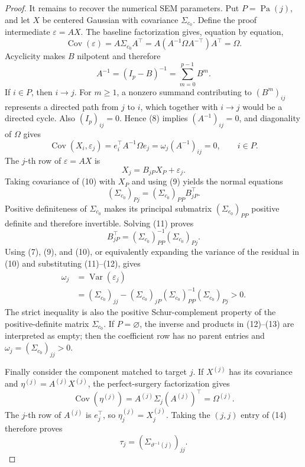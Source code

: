 \documentclass{article}
\begin{document}
\begin{proof}
It remains to recover the numerical SEM parameters.  Put
\(P=\operatorname{Pa}(j)\), and let \(X\) be centered Gaussian with covariance
\(\Sigma_{c_0}\).  Define the proof intermediate \(\varepsilon=AX\).  The
baseline factorization gives, equation by equation,
\[
 \operatorname{Cov}(\varepsilon)
 =A\Sigma_{c_0}A^{\top}
 =A(A^{-1}\Omega A^{-\top})A^{\top}
 =\Omega.                                               \tag{7}
\]
Acyclicity makes \(B\) nilpotent and therefore
\[
 A^{-1}=(I_p-B)^{-1}=\sum_{m=0}^{p-1}B^m.               \tag{8}
\]
If \(i\in P\), then \(i\to j\).  For \(m\geq1\), a nonzero summand
contributing to \((B^m)_{ij}\) represents a directed path from \(j\) to
\(i\), which together with \(i\to j\) would be a directed cycle.  Also
\((I_p)_{ij}=0\).  Hence (8) implies
\((A^{-1})_{ij}=0\), and diagonality of \(\Omega\) gives
\[
 \operatorname{Cov}(X_i,\varepsilon_j)
 =e_i^{\top}A^{-1}\Omega e_j
 =\omega_j(A^{-1})_{ij}=0,
 \qquad i\in P.                                        \tag{9}
\]
The \(j\)-th row of \(\varepsilon=AX\) is
\[
 X_j=B_{jP}X_P+\varepsilon_j.                           \tag{10}
\]
Taking covariance of (10) with \(X_P\) and using (9) yields the normal
equations
\[
 (\Sigma_{c_0})_{Pj}
 =(\Sigma_{c_0})_{PP}B_{jP}^{\top}.                     \tag{11}
\]
Positive definiteness of \(\Sigma_{c_0}\) makes its principal submatrix
\((\Sigma_{c_0})_{PP}\) positive definite and therefore invertible.  Solving
(11) proves
\[
 B_{jP}^{\top}
 =(\Sigma_{c_0})_{PP}^{-1}(\Sigma_{c_0})_{Pj}.           \tag{12}
\]
Using (7), (9), and (10), or equivalently expanding the variance of the
residual in (10) and substituting (11)--(12), gives
\[
 \begin{aligned}
 \omega_j
 &=\operatorname{Var}(\varepsilon_j)\\
 &=(\Sigma_{c_0})_{jj}
   -(\Sigma_{c_0})_{jP}
    (\Sigma_{c_0})_{PP}^{-1}
    (\Sigma_{c_0})_{Pj}>0.                              \tag{13}
 \end{aligned}
\]
The strict inequality is also the positive Schur-complement property of the
positive-definite matrix \(\Sigma_{c_0}\).  If \(P=\varnothing\), the inverse
and products in (12)--(13) are interpreted as empty; then the coefficient row
has no parent entries and \(\omega_j=(\Sigma_{c_0})_{jj}>0\).

Finally consider the component matched to target \(j\).  If \(X^{(j)}\) has
its covariance and \(\eta^{(j)}=A^{(j)}X^{(j)}\), the perfect-surgery
factorization gives
\[
 \operatorname{Cov}(\eta^{(j)})
 =A^{(j)}\Sigma_j(A^{(j)})^{\top}
 =\Omega^{(j)}.                                         \tag{14}
\]
The \(j\)-th row of \(A^{(j)}\) is \(e_j^{\top}\), so
\(\eta_j^{(j)}=X_j^{(j)}\).  Taking the \((j,j)\) entry of (14) therefore
proves
\[
 \tau_j=(\Sigma_{\vartheta^{-1}(j)})_{jj}.              \tag{15}
\]


\end{proof}
\end{document}
